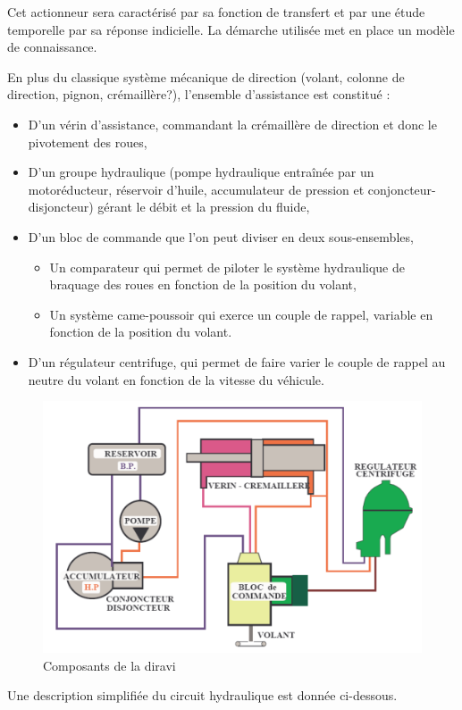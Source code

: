 Cet actionneur sera caractérisé par sa fonction de transfert et par une étude temporelle par sa réponse indicielle. 
La démarche utilisée met en place un modèle de connaissance.

En plus du classique système mécanique de direction (volant, colonne de direction, pignon, crémaillère?), l'ensemble d'assistance est constitué :
\begin{itemize}
 \item D'un vérin d'assistance, commandant la crémaillère de direction et donc le pivotement des roues,
 \item D'un groupe hydraulique (pompe hydraulique entraînée par un motoréducteur, réservoir d'huile, accumulateur de pression et conjoncteur-disjoncteur) gérant le débit et la pression du fluide,
 \item D'un bloc de commande que l'on peut diviser en deux sous-ensembles,
 \begin{itemize}
 \item Un comparateur qui permet de piloter le système hydraulique de braquage des roues en fonction de la position du volant,
 \item Un système came-poussoir qui exerce un couple de rappel, variable en fonction de la position du volant.
\end{itemize}
 \item D'un régulateur centrifuge, qui permet de faire varier le couple de rappel au neutre du volant en fonction de la vitesse du véhicule.
\end{itemize}

\begin{figure}[!h]
 \centering\includegraphics[width=0.7\linewidth]{img/diravi2.png}
 \caption{Composants de la diravi}
 \label{diravi2}
\end{figure}

Une description simplifiée du circuit hydraulique est donnée ci-dessous.

